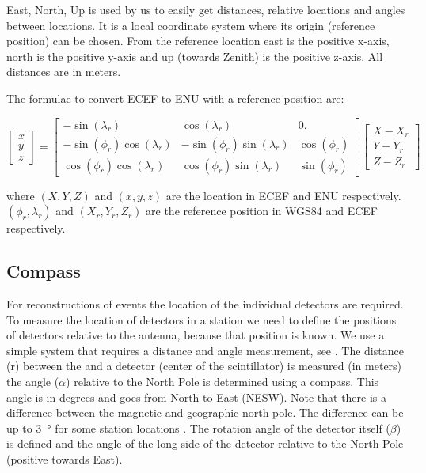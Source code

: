 East, North, Up is used by us to easily get distances, relative locations
and angles between locations. It is a local coordinate system where its
origin (reference position) can be chosen. From the reference location
east is the positive x-axis, north is the positive y-axis and up (towards
Zenith) is the positive z-axis. All distances are in meters.

The formulae to convert ECEF to ENU with a reference position are:

\begin{equation}
    \begin{bmatrix}
    x \\ y \\ z
    \end{bmatrix}
    = 
    \begin{bmatrix}
                 -\sin(\lambda_r) &               \cos(\lambda_r) &           0. \\
    -\sin(\phi_r) \cos(\lambda_r) & -\sin(\phi_r) \sin(\lambda_r) & \cos(\phi_r) \\
     \cos(\phi_r) \cos(\lambda_r) &  \cos(\phi_r) \sin(\lambda_r) & \sin(\phi_r)
    \end{bmatrix}
    \begin{bmatrix}
    X - X_r \\ Y - Y_r \\ Z - Z_r
    \end{bmatrix}
\end{equation}

where  $(X, Y, Z)$ and $(x, y, z)$ are the location in ECEF and ENU
respectively. $(\phi_r, \lambda_r)$ and $(X_r, Y_r, Z_r)$ are the
reference position in WGS84 and ECEF respectively.


\subsection{Compass}

For reconstructions of events the location of the individual detectors
are required. To measure the location of detectors in a station we need
to define the positions of detectors relative to the \gps antenna,
because that position is known. We use a simple system that requires a
distance and angle measurement, see . The
distance (r) between the \gps and a detector (center of the
scintillator) is measured (in meters) the angle ($\alpha$) relative to
the North Pole is determined using a compass. This angle is in degrees
and goes from North to East (NESW). Note that there is a difference
between the magnetic and geographic north pole. The difference can be up
to \SI{3}{\degree} for some \hisparc station locations
\cite{canada:2013aa}. The rotation angle of the detector itself
($\beta$) is defined and the angle of the long side of the detector
relative to the North Pole (positive towards East).

